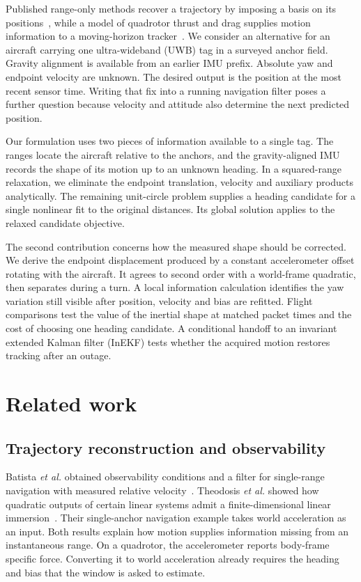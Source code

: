 \documentclass{IEEEtaes}
\begin{document}
Published range-only methods recover a trajectory by imposing a basis on its positions~\cite{pacholska}, while a model of quadrotor thrust and drag supplies motion information to a moving-horizon tracker~\cite{pfeiffer}. We consider an alternative for an aircraft carrying one ultra-wideband (UWB) tag in a surveyed anchor field. Gravity alignment is available from an earlier IMU prefix. Absolute yaw and endpoint velocity are unknown. The desired output is the position at the most recent sensor time. Writing that fix into a running navigation filter poses a further question because velocity and attitude also determine the next predicted position.

Our formulation uses two pieces of information available to a single tag. The ranges locate the aircraft relative to the anchors, and the gravity-aligned IMU records the shape of its motion up to an unknown heading. In a squared-range relaxation, we eliminate the endpoint translation, velocity and auxiliary products analytically. The remaining unit-circle problem supplies a heading candidate for a single nonlinear fit to the original distances. Its global solution applies to the relaxed candidate objective.

The second contribution concerns how the measured shape should be corrected. We derive the endpoint displacement produced by a constant accelerometer offset rotating with the aircraft. It agrees to second order with a world-frame quadratic, then separates during a turn. A local information calculation identifies the yaw variation still visible after position, velocity and bias are refitted. Flight comparisons test the value of the inertial shape at matched packet times and the cost of choosing one heading candidate. A conditional handoff to an invariant extended Kalman filter (InEKF) tests whether the acquired motion restores tracking after an outage.

\section{Related work}\label{sec:related}
\subsection{Trajectory reconstruction and observability}
Batista \emph{et al.} obtained observability conditions and a filter for single-range navigation with measured relative velocity~\cite{batista}. Theodosis \emph{et al.} showed how quadratic outputs of certain linear systems admit a finite-dimensional linear immersion~\cite{theodosis}. Their single-anchor navigation example takes world acceleration as an input. Both results explain how motion supplies information missing from an instantaneous range. On a quadrotor, the accelerometer reports body-frame specific force. Converting it to world acceleration already requires the heading and bias that the window is asked to estimate.
\end{document}

